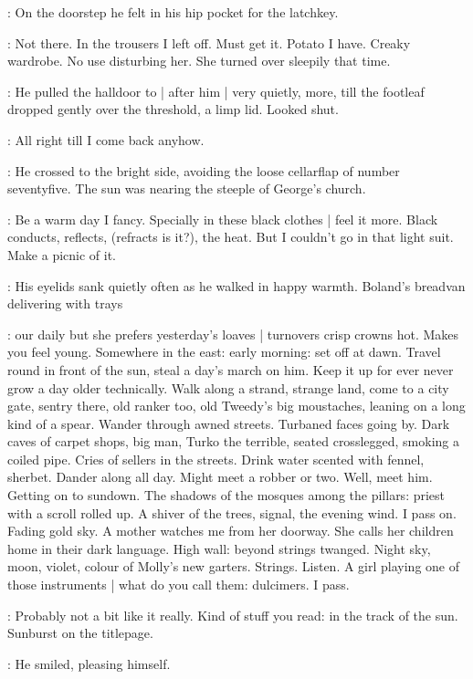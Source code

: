 :
On the doorstep he felt in his hip pocket for the latchkey.

\BloomInt:
Not there.
In the trousers I left off.
Must get it.
Potato I have.
Creaky wardrobe.
No use disturbing her.
She turned over sleepily that time.

:
He pulled the halldoor to |
after him |
very quietly, more,
till the footleaf dropped gently over the threshold,
a limp lid.
Looked shut.

\BloomInt:
All right till I come back anyhow.

:
He crossed to the bright side,
avoiding the loose cellarflap of number seventyfive.
The sun was nearing the steeple of George's church.

\BloomInt:
Be a warm day I fancy.
Specially in these black clothes |
feel it more.
Black conducts, reflects, (refracts is it?), the heat.
But I couldn't go in that light suit.
Make a picnic of it.

:
His eyelids sank quietly often as he walked in happy warmth.
Boland's breadvan delivering with trays

\BloomInt:
our daily but she prefers yesterday's loaves |
turnovers crisp crowns hot.
Makes you feel young.
Somewhere in the east:
early morning:
set off at dawn.
Travel round in front of the sun,
steal a day's march on him.
Keep it up for ever never grow a day older technically.
Walk along a strand,
strange land,
come to a city gate,
sentry there,
old ranker too, old
Tweedy's big moustaches,
leaning on a long kind of a spear.
Wander through awned streets.
Turbaned faces going by.
Dark caves of carpet shops,
big man, Turko the terrible,
seated crosslegged, smoking a coiled pipe.
Cries of sellers in the streets.
Drink water scented with fennel, sherbet.
Dander along all day.
Might meet a robber or two.
Well, meet him.
Getting on to sundown.
The shadows of the mosques among the pillars:
priest with a scroll rolled up.
A shiver of the trees, signal, the evening wind.
I pass on.
Fading gold sky.
A mother watches me from her doorway.
She calls her children home in their dark language.
High wall:
beyond strings twanged.
Night sky, moon, violet,
colour of Molly's new garters.
Strings.
Listen.
A girl playing one of those instruments |
what do you call them:
dulcimers.
I pass.

\BloomInt:
Probably not a bit like it really.
Kind of stuff you read:
in the track of the sun.
Sunburst on the titlepage.

:
He smiled, pleasing himself.

